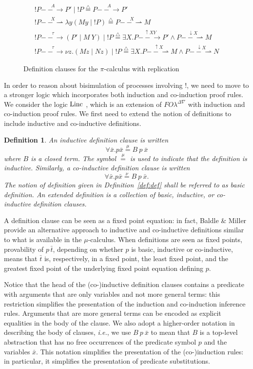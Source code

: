 \documentclass{acmtrans2m}
\newenvironment{definition}{\begin{define} \rm}{\end{define}}
\newtheorem{define}[theorem]{Definition}
\newcommand{\FOL   }{FO\lambda}
\newcommand{\FOLDNb}{\FOL^{\Delta\nabla}}
\newcommand{\Linc}{{\rm Linc}}
\newcommand{\defeq}{\mathrel{\stackrel{{\scriptscriptstyle\triangle}}{=}}}
\newcommand{\defmu}{\mathrel{\stackrel{\mu}{=}}}
\newcommand{\defnu}{\mathrel{\stackrel{\nu}{=}}}
\newcommand{\inact}{\mathop{\downarrow}}
\newcommand{\nupi}[2]{\nu #1.#2}
\newcommand{\one  }[3]{#1\stackrel{#2}{-\!\!-\!\!\!\rightarrow    } #3}
\newcommand{\onep }[3]{#1\stackrel{#2}{-\!\!-\!\!\!\rightharpoonup} #3}
\newcommand{\outact}{\mathop{\uparrow}}
\newcommand{\barpi}{\mathbin{|}}
\begin{document}
\begin{figure}
$$
\begin{array}{l}
\one{!P}{A}{P' \barpi  !P} \defeq \one{P}{A}{P'} \\
\onep{!P}{X}{\lambda y(M y \barpi  !P)} \defeq \onep{P}{X}{M} \\
\one{!P}{\tau}{(P' \barpi  M~Y) \barpi !P} \defeq \exists X. \one{P}{\outact X Y}{P'} \land 
     \onep{P}{\inact X}{M} \\
\one{!P}{\tau}{\nupi{z}{(Mz \barpi  N z)} \barpi  !P} \defeq
\exists X. \onep{P}{\outact X}{M} \land \onep{P}{\inact X}{N}
\end{array}
$$
\caption{Definition clauses for the $\pi$-calculus with replication}
\label{fig:rep-pi def}
\end{figure}

In order to reason about bisimulation of processes involving $!$, we need to move
to a stronger logic which incorporates both induction and co-induction
proof rules. We consider the logic $\Linc$ \cite{tiu04phd}, which is an extension of
$\FOLDNb$ with induction and co-induction proof rules. 
We first need to extend the notion of definitions to include inductive
and co-inductive definitions. 

\begin{definition}
An inductive definition clause is written
$$
\forall \bar x. p \bar x \defmu B~ p~\bar x
$$
where $B$ is a closed term. The symbol $\defmu$ is used to indicate
that the definition is inductive. 
Similarly, a co-inductive definition clause is written
$$
\forall \bar x. p \bar x \defnu B~ p~\bar x.
$$
The notion of definition given in Definition~\ref{def:def}
shall be referred to as {\em basic definition}.
An {\em extended definition} is a collection of 
basic, inductive, or co-inductive definition clauses.
\end{definition}
A definition clause can be seen as a fixed point 
equation: in fact, Baldle \& Miller \citeyear{baelde07lpar} provide an
alternative approach to inductive and co-inductive definitions similar
to what is available in the $\mu$-calculus.
When definitions are seen as fixed points, provability of
$p\,\bar t$, depending on whether $p$ is basic, inductive or co-inductive, 
means that $\bar t$ is, respectively, in a fixed point, the least fixed point, and 
the greatest fixed point of the underlying fixed point equation defining $p$.


Notice that the head of the (co-)inductive definition clauses contains
a predicate with arguments that are only variables and not more
general terms: this restriction simplifies the presentation
of the induction and co-induction inference rules.  Arguments that are more
general terms can
be encoded as explicit equalities in the body of the clause.
We also adopt a higher-order notation in describing the body
of clauses, {\em i.e.}, we use $B~p~\bar x$ to mean that $B$ is a
top-level abstraction that has
no free occurrences of the predicate symbol $p$ and the variables $\bar x$.
This notation simplifies the presentation of the (co-)induction
rules: in particular, it simplifies the presentation of predicate
substitutions.
\end{document}
